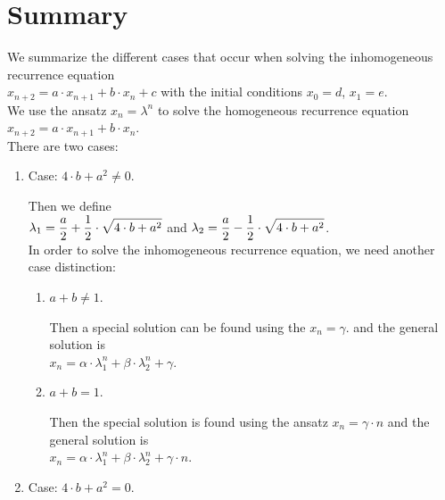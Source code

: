 \section{Summary}
We summarize the different cases that occur when solving the inhomogeneous recurrence equation
\\[0.2cm]
\hspace*{1.3cm}
$x_{n+2} = a \cdot x_{n+1} + b \cdot x_n + c$ \quad with the initial  conditions \quad $x_0 = d$, $x_1 = e$.
\\[0.2cm]
We use the ansatz $x_n = \lambda^n$ to solve the homogeneous recurrence equation
\\[0.2cm]
\hspace*{1.3cm}
$x_{n+2} = a \cdot x_{n+1} + b \cdot x_n$.
\\[0.2cm]
There are two cases:
\begin{enumerate}
\item Case: $4 \cdot b + a^2 \not= 0$.

      Then we define
      \\[0.2cm]
      \hspace*{1.3cm}
      $\displaystyle\lambda_1 = \frac{a}{2} + \frac{1}{2} \cdot \sqrt{4 \cdot b + a^2}$ \quad and \quad
      $\displaystyle\lambda_2 = \frac{a}{2} - \frac{1}{2} \cdot \sqrt{4 \cdot b + a^2}$.
      \\[0.2cm]
      In order to solve the inhomogeneous recurrence equation, we need another case distinction:
      \begin{enumerate}
      \item $a + b \not= 1$.
        
            Then a special solution can be found using the   $x_n = \gamma$.
            and the general solution is
            \\[0.2cm]
            \hspace*{1.3cm}
            $x_n = \alpha \cdot \lambda_1^n + \beta \cdot \lambda_2^n + \gamma$.
      \item $a + b = 1$.

            Then the special solution is found using the ansatz $x_n = \gamma \cdot n$ and the general
            solution is
            \\[0.2cm]
            \hspace*{1.3cm}
            $x_n = \alpha \cdot \lambda_1^n + \beta \cdot \lambda_2^n + \gamma \cdot n$.
      \end{enumerate}
\item Case: $4 \cdot b + a^2 = 0$.


\end{enumerate}
